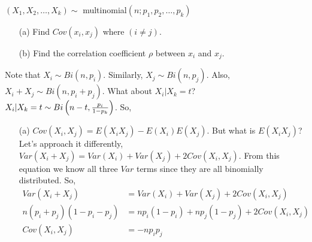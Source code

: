 \documentclass[english, 11pt]{article}
\begin{document}
  \begin{exmp}
    $(X_1, X_2, \ldots, X_k) \sim$ multinomial$(n; p_1, p_2, \ldots, p_k)$
    \begin{itemize}
      \item[(a)] Find $Cov(x_i, x_j)$ where $(i \not = j)$.
      \item[(b)] Find the correlation coefficient $\rho$ between $x_i$ and $x_j$.
    \end{itemize}

    Note that $X_i \sim Bi(n, p_i)$. Similarly, $X_j \sim Bi(n, p_j)$. Also, $X_i + X_j \sim Bi(n, p_i +p_j)$. What about $X_i | X_k = t$? $X_i | X_k = t \sim Bi\left(n-t, \frac{p_i}{1-p_k} \right)$. So,


    \begin{itemize}
      \item[(a)] $Cov(X_i, X_j) = E(X_iX_j) - E(X_i)E(X_j)$. But what is $E(X_iX_j)$? Let's approach it differently, \\

      $Var(X_i + X_j) = Var(X_i) + Var(X_j) + 2Cov(X_i, X_j)$. From this equation we know all three $Var$ terms since they are all binomially distributed. So,
      \begin{align*}
        Var(X_i + X_j) & = Var(X_i) + Var(X_j) + 2Cov(X_i, X_j) \\
        n(p_i + p_j)(1-p_i-p_j) & = np_i(1-p_i) + np_j(1-p_j) + 2Cov(X_i, X_j) \\
        Cov(X_i, X_j) & = -np_ip_j
      \end{align*}
    \end{itemize}
  \end{exmp}
\end{document}
